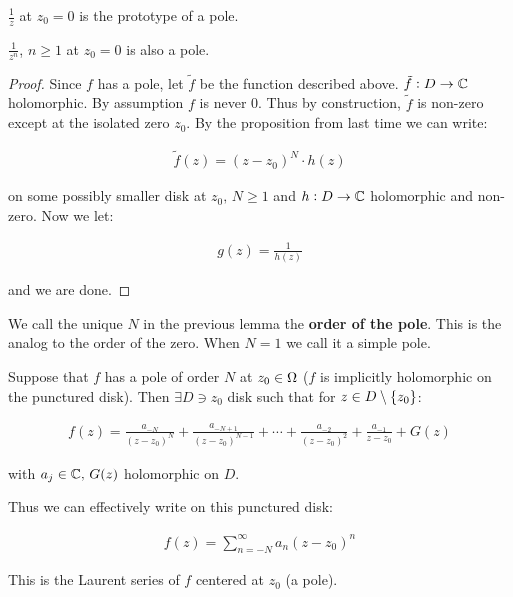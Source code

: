 \begin{example}
$\frac{1}{z}$ at $z_0 = 0$ is the prototype of a pole.
\end{example}

\begin{example}
$\frac{1}{z^n}$, $n \geq 1$ at $z_0 = 0$ is also a pole.
\end{example}

\begin{proof}
Since $f$ has a pole, let $\tilde{f}$ be the function described above. $\tilde{f}: D \to \mathbb{C}$ holomorphic. By assumption $f$ is never 0. Thus by construction, $\tilde{f}$ is non-zero except at the isolated zero $z_0$. By the proposition from last time we can write:

\begin{align*}
    \tilde{f} (z) = (z-z_0)^N \cdot h(z) 
\end{align*}

on some possibly smaller disk at $z_0, \, N \geq 1$ and $h:D \to \mathbb{C}$ holomorphic and non-zero. Now we let:

\begin{align*}
    g(z) = \frac{1}{h(z)}
\end{align*}

and we are done.

\end{proof}

\begin{definition}
We call the unique $N$ in the previous lemma the \textbf{order of the pole}. This is the analog to the order of the zero. When $N=1$ we call it a simple pole.
\end{definition}


\begin{lemma}
Suppose that $f$ has a pole of order $N$ at $z_0 \in \Omega$ ($f$ is implicitly holomorphic on the punctured disk). Then $\exists D \ni z_0$ disk such that for $z\in D \setminus \{ z_0 \}$:

\begin{align*}
    f(z) = \frac{a_{-N}}{(z-z_0)^N} + \frac{a_{-N+1}}{(z-z_0)^{N-1}} + \cdots + \frac{a_{-2}}{(z-z_0)^2} + \frac{a_{-1}}{z-z_0} + G(z)
\end{align*}

with $a_j \in \mathbb{C}, \, G(z) $ holomorphic on $D$.

Thus we can effectively write on this punctured disk:

\begin{align*}
    f(z) = \sum_{n=-N}^\infty a_n (z-z_0)^n 
\end{align*}

This is the Laurent series of $f$ centered at $z_0$ (a pole).


\end{lemma}

